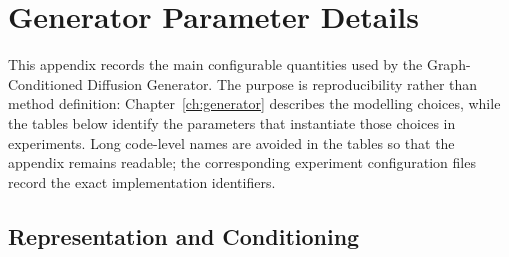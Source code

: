 
\chapter{Generator Parameter Details}

\label{app:generator-parameters}
This appendix records the main configurable quantities used by the
Graph-Conditioned Diffusion Generator. The purpose is
reproducibility rather than method definition: Chapter~\ref{ch:generator}
describes the modelling choices, while the tables below identify the
parameters that instantiate those choices in experiments. Long code-level
names are avoided in the tables so that the appendix remains readable; the
corresponding experiment configuration files record the exact implementation
identifiers.

\section{Representation and Conditioning}

